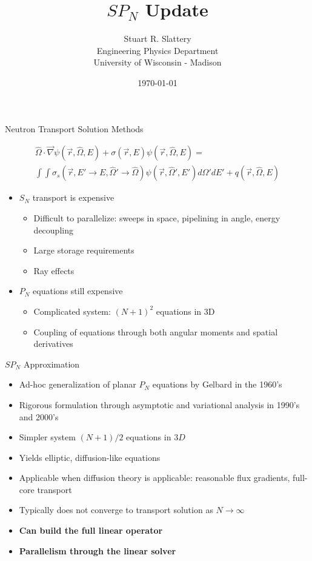 \documentclass{beamer}
\author{Stuart R. Slattery
  \\ Engineering Physics Department
  \\ University of Wisconsin - Madison
}
\date{\today}
\title{$SP_N$ Update}
\begin{document}
\maketitle

\begin{frame}{Neutron Transport Solution Methods}

  \begin{multline}
    \hat{\Omega} \cdot \vec{\nabla} \psi(\vec{r},\hat{\Omega},E) +
    \sigma(\vec{r},E) \psi(\vec{r},\hat{\Omega},E) = \\ \int \int
    \sigma_s(\vec{r},E' \rightarrow E,\hat{\Omega}' \rightarrow
    \hat{\Omega}) \psi(\vec{r},\hat{\Omega}',E') d\Omega' dE' +
    q(\vec{r},\hat{\Omega},E)
    \label{eq:general_transport}
  \end{multline}

  \begin{itemize}
  \item $S_N$ transport is expensive
    \begin{itemize}
    \item Difficult to parallelize: sweeps in space, pipelining in
      angle, energy decoupling
    \item Large storage requirements
    \item Ray effects
    \end{itemize}
  \item $P_N$ equations still expensive
    \begin{itemize}
    \item Complicated system: $(N+1)^2$ equations in 3D
    \item Coupling of equations through both angular moments and
      spatial derivatives
    \end{itemize}
  \end{itemize}
\end{frame}

\begin{frame}{$SP_N$ Approximation}
  \begin{itemize}
  \item Ad-hoc generalization of planar $P_N$ equations by Gelbard in
    the 1960's
  \item Rigorous formulation through asymptotic and variational
    analysis in 1990's and 2000's
  \item Simpler system $(N+1)/2$ equations in $3D$
  \item Yields elliptic, diffusion-like equations
  \item Applicable when diffusion theory is applicable: reasonable
    flux gradients, full-core transport
  \item Typically does not converge to transport solution as
    $N\rightarrow \infty$
  \item {\bf Can build the full linear operator}
  \item {\bf Parallelism through the linear solver}
  \end{itemize}
\end{frame}
\end{document}
